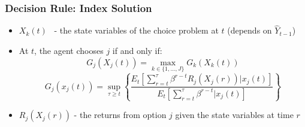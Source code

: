\documentclass[xcolor=pdftex,dvipsnames,table,mathserif,aspectratio=169]{beamer}
\begin{document}

\begin{frame}[label=GITTINS]

\frametitle{Decision Rule: Index Solution}

\begin{itemize}
\item $X_{k}(t)$ \ - the state variables of the choice problem at $t$
(depends on $\widehat{Y}_{t-1}$)

\item At $t$, the agent chooses $j$ if and only if:%
\[
G_{j}(X_{j}(t))=\max_{k\in \{1,...,J\}}G_{k}(X_{k}(t)) 
\]%
\[
G_{j}(x_{j}(t))=\sup_{\tau \geq t}\left\{ \frac{E_{t}\left[ \sum_{r=t}^{\tau
}\beta ^{r-t}R_{j}(X_{j}(r))|x_{j}(t)\right] }{E_{t}\left[ \sum_{r=t}^{\tau
}\beta ^{r-t}|x_{j}(t)\right] }\right\} 
\]

\item $R_{j}(X_{j}(r))$ - the returns from option $j$ given the state
variables at time $r$
\end{itemize}

\hyperlink{DYNAM}{}
\end{frame}
\end{document}
